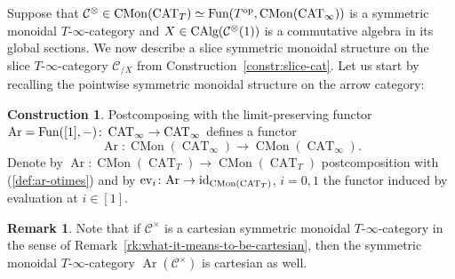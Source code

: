 \documentclass[reqno]{memo-l}
\theoremstyle{mythm}
\theoremstyle{definition}
\newtheorem{rk}[thm]{Remark}
\newtheorem{constr}[thm]{Construction}
\numberwithin{equation}{section}
\newcommand{\Cc}{{\mathcal{C}}}
\DeclareMathOperator{\ev}{ev}
\DeclareMathOperator{\CAT}{CAT}
\newcommand{\Fun}{{\textup{Fun}}}
\DeclareMathOperator{\Ar}{Ar}
\DeclareMathOperator{\CMon}{CMon}
\newcommand{\op}{{\textup{op}}}
\DeclareMathOperator{\CAlg}{\textup{CAlg}}
\newcommand{\id}{\textup{id}}
\begin{document}
Suppose that $\mathcal C^{\otimes}\in \CMon(\CAT_T)\simeq \Fun(T^{\op},\CMon(\CAT_\infty))$ is a symmetric monoidal $T$-$\infty$-category and $X\in\CAlg(\mathcal C^{\otimes}(1))$ is a commutative algebra in its global sections. We now describe a slice symmetric monoidal structure on the slice $T$-$\infty$-category $\mathcal C_{/X}$ from Construction~\ref{constr:slice-cat}.
Let us start by recalling the pointwise symmetric monoidal structure on the arrow category:  

\begin{constr}
    Postcomposing with the limit-preserving functor  $\Ar=\Fun([1],-)\colon \CAT_\infty\to \CAT_\infty$ defines a functor 
    \begin{equation}\label{def:ar-otimes}
        \Ar\colon \CMon(\CAT_\infty)\to\CMon(\CAT_\infty).
    \end{equation}
    Denote by ${\Ar}\colon \CMon(\CAT_T)\to \CMon(\CAT_T)$ postcomposition with (\ref{def:ar-otimes}) and by $\ev_i\colon {\Ar}\to \id_{\CMon(\CAT_{T})}$, $i=0,1$ the functor induced by evaluation at $i\in[1]$. 
\end{constr}

\begin{rk}
    Note that if $\Cc^{\times}$ is a cartesian symmetric monoidal $T$-$\infty$-category in the sense of Remark~\ref{rk:what-it-means-to-be-cartesian}, then the symmetric monoidal $T$-$\infty$-category $\Ar(\mathcal C^{\times})$ is cartesian as well. 
\end{rk}
\end{document}
